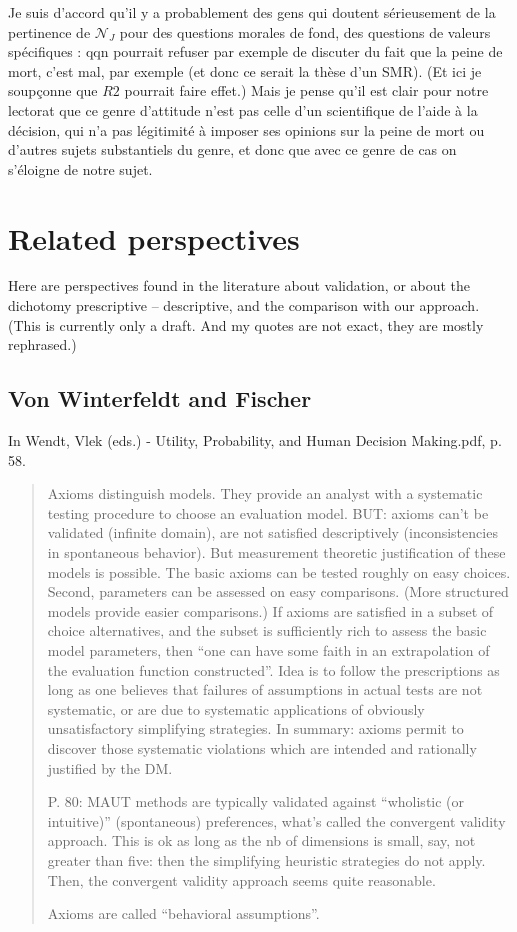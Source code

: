 \documentclass[preprint, french, english, 11pt, authoryear]{elsarticle}%
\newcommand{\fadv}{\mathscr{N}_J}%
\begin{document}
Je suis d’accord qu’il y a probablement des gens qui doutent sérieusement de la pertinence de $\fadv$ pour des questions morales de fond, des questions de valeurs spécifiques : qqn pourrait refuser par exemple de discuter du fait que la peine de mort, c’est mal, par exemple (et donc ce serait la thèse d’un SMR). (Et ici je soupçonne que $R2$ pourrait faire effet.) Mais je pense qu’il est clair pour notre lectorat que ce genre d’attitude n’est pas celle d’un scientifique de l’aide à la décision, qui n’a pas légitimité à imposer ses opinions sur la peine de mort ou d’autres sujets substantiels du genre, et donc que avec ce genre de cas on s’éloigne de notre sujet.


\section{Related perspectives}
\label{sec-related}
Here are perspectives found in the literature about validation, or about the dichotomy prescriptive – descriptive, and the comparison with our approach. (This is currently only a draft. And my quotes are not exact, they are mostly rephrased.)

\subsection{Von Winterfeldt and Fischer}
In Wendt, Vlek (eds.) - Utility, Probability, and Human Decision Making.pdf, p. 58.

\begin{quote}
Axioms distinguish models. They provide an analyst with a systematic testing procedure to choose an evaluation model. BUT: axioms can’t be validated (infinite domain), are not satisfied descriptively (inconsistencies in spontaneous behavior). But measurement theoretic justification of these models is possible. The basic axioms can be tested roughly on easy choices. Second, parameters can be assessed on easy comparisons. (More structured models provide easier comparisons.) If axioms are satisfied in a subset of choice alternatives, and the subset is sufficiently rich to assess the basic model parameters, then “one can have some faith in an extrapolation of the evaluation function constructed”. Idea is to follow the prescriptions as long as one believes that failures of assumptions in actual tests are not systematic, or are due to systematic applications of obviously unsatisfactory simplifying strategies. In summary: axioms permit to discover those systematic violations which are intended and rationally justified by the DM. 

P. 80: MAUT methods are typically validated against “wholistic (or intuitive)” (spontaneous) preferences, what’s called the convergent validity approach. This is ok as long as the nb of dimensions is small, say, not greater than five: then the simplifying heuristic strategies do not apply. Then, the convergent validity approach seems quite reasonable.

Axioms are called “behavioral assumptions”.
\end{quote}
\end{document}
